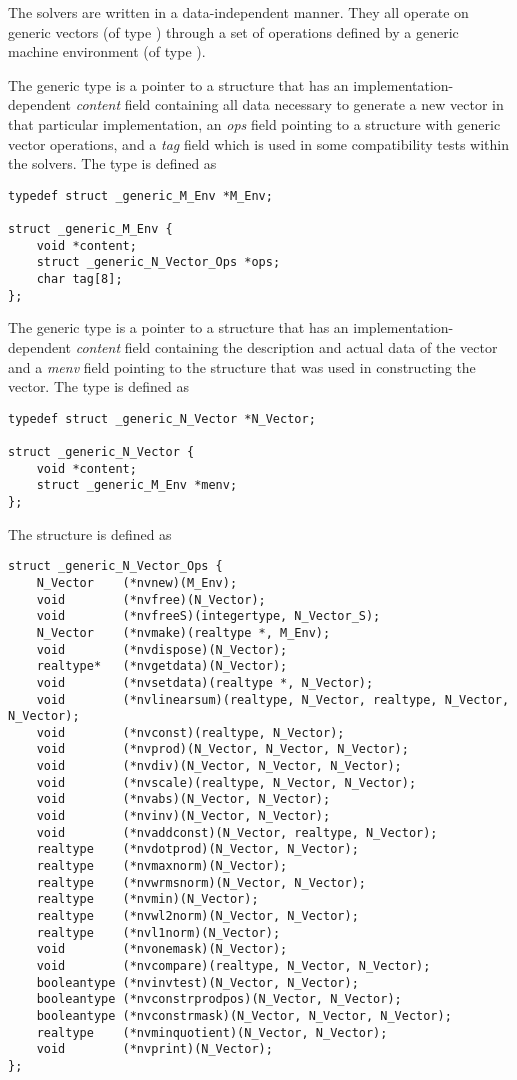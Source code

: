 %
The {\sundials} solvers are written in a data-independent manner. 
They all operate on generic vectors (of type ) through a set of
operations defined by a generic machine environment (of type ). 

The generic  type is a pointer to a structure that has an
implementation-dependent {\em content} field containing
all data necessary to generate a new vector in that particular
implementation, an {\em ops} field pointing to a structure with
generic vector operations, and a {\em tag} field which is used
in some compatibility tests within the {\sundials} solvers. 
The type  is defined as
\begin{verbatim}
typedef struct _generic_M_Env *M_Env;

struct _generic_M_Env {
    void *content;
    struct _generic_N_Vector_Ops *ops;
    char tag[8];
};
\end{verbatim}

The generic  type is a pointer to a structure that has an 
implementation-dependent {\em content} field containing the 
description and actual data of the vector and a {\em menv} field 
pointing to the  structure that was used in constructing the
vector.
The type  is defined as
\begin{verbatim}
typedef struct _generic_N_Vector *N_Vector;

struct _generic_N_Vector {
    void *content;
    struct _generic_M_Env *menv;
};
\end{verbatim}

The  structure is defined as
\begin{verbatim}
struct _generic_N_Vector_Ops {
    N_Vector    (*nvnew)(M_Env);
    void        (*nvfree)(N_Vector);
    void        (*nvfreeS)(integertype, N_Vector_S);
    N_Vector    (*nvmake)(realtype *, M_Env);
    void        (*nvdispose)(N_Vector);
    realtype*   (*nvgetdata)(N_Vector);
    void        (*nvsetdata)(realtype *, N_Vector);
    void        (*nvlinearsum)(realtype, N_Vector, realtype, N_Vector, N_Vector); 
    void        (*nvconst)(realtype, N_Vector);
    void        (*nvprod)(N_Vector, N_Vector, N_Vector);
    void        (*nvdiv)(N_Vector, N_Vector, N_Vector);
    void        (*nvscale)(realtype, N_Vector, N_Vector);
    void        (*nvabs)(N_Vector, N_Vector);
    void        (*nvinv)(N_Vector, N_Vector);
    void        (*nvaddconst)(N_Vector, realtype, N_Vector);
    realtype    (*nvdotprod)(N_Vector, N_Vector);
    realtype    (*nvmaxnorm)(N_Vector);
    realtype    (*nvwrmsnorm)(N_Vector, N_Vector);
    realtype    (*nvmin)(N_Vector);
    realtype    (*nvwl2norm)(N_Vector, N_Vector);
    realtype    (*nvl1norm)(N_Vector);
    void        (*nvonemask)(N_Vector);
    void        (*nvcompare)(realtype, N_Vector, N_Vector);
    booleantype (*nvinvtest)(N_Vector, N_Vector);
    booleantype (*nvconstrprodpos)(N_Vector, N_Vector);
    booleantype (*nvconstrmask)(N_Vector, N_Vector, N_Vector);
    realtype    (*nvminquotient)(N_Vector, N_Vector);
    void        (*nvprint)(N_Vector);
};
\end{verbatim}

